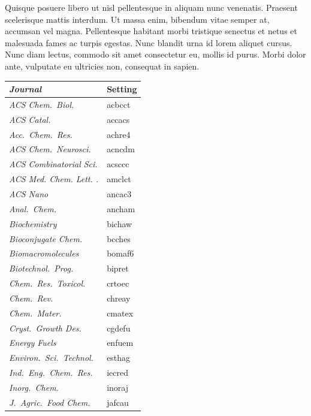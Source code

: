 \documentclass[english,journal=jctcce,etalmode=truncate,maxauthors=0]{achemso}
\begin{document}
Quisque posuere libero ut nisl pellentesque in aliquam nunc venenatis. Praesent scelerisque mattis interdum. Ut massa enim, bibendum vitae semper at, accumsan vel magna. Pellentesque habitant morbi tristique senectus et netus et malesuada fames ac turpis egestas. Nunc blandit urna id lorem aliquet cursus. Nunc diam lectus, commodo sit amet consectetur eu, mollis id purus. Morbi dolor ante, vulputate eu ultricies non, consequat in sapien.

\begin{table}
  \centering
  \begin{tabular}{>{\itshape}l>{\ttfamily}l}
    \toprule
      Journal                  & Setting \\
    \midrule
      ACS Chem.\ Biol.         & acbcct  \\
      ACS Catal.               & accacs  \\
      Acc.\ Chem.\ Res.        & achre4  \\
      ACS Chem.\ Neurosci.     & acncdm  \\
      ACS Combinatorial Sci.   & acsccc  \\
      ACS Med. Chem. Lett. .   & amclct  \\
      ACS Nano                 & ancac3  \\
      Anal.\ Chem.             & ancham  \\
      Biochemistry             & bichaw  \\
      Bioconjugate Chem.       & bcches  \\
      Biomacromolecules        & bomaf6  \\
      Biotechnol.\ Prog.       & bipret  \\
      Chem.\ Res.\ Toxicol.    & crtoec  \\
      Chem.\ Rev.              & chreay  \\
      Chem.\ Mater.            & cmatex  \\
      Cryst.\ Growth Des.      & cgdefu  \\
      Energy Fuels             & enfuem  \\
      Environ.\ Sci.\ Technol. & esthag  \\
      Ind.\ Eng.\ Chem.\ Res.  & iecred  \\
      Inorg.\ Chem.            & inoraj  \\
      J.~Agric.\ Food Chem.    & jafcau  \\

\end{tabular}
\end{table}
\end{document}
